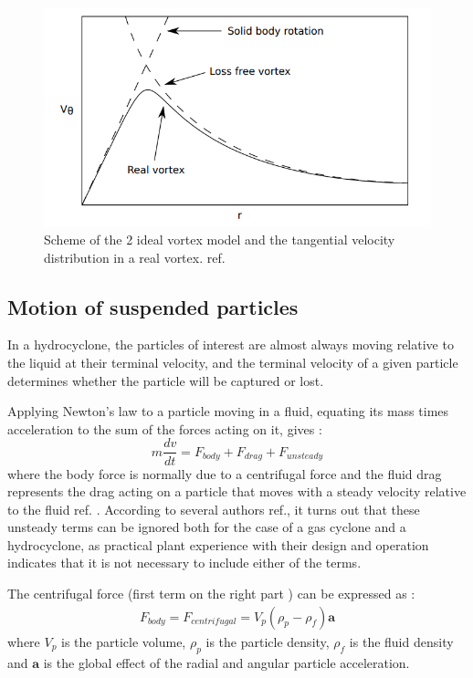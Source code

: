 \begin{figure}[H]
	\centering
	\includegraphics[width=0.5\linewidth]{images/tangential_velocity_schema.png}
	\captionsetup{font=bf, size=small}
	\caption{Scheme of the 2 ideal vortex model and the tangential velocity distribution in a real vortex. ref.\cite{Marthinussen2011}}
	\label{tangential_velocity}
\end{figure}

\subsection{Motion of suspended particles}
In a hydrocyclone, the particles of interest are almost always moving relative to the liquid at their terminal velocity, and the terminal velocity of a given particle determines whether the particle will be captured or lost.

Applying Newton’s law to a particle moving in a fluid, equating its mass times acceleration to the sum of the forces acting on it, gives :
\begin{equation}
	m \frac{d v}{d t}= F_{body} + F_{drag} + F_{unsteady}
\end{equation}
where the body force is normally due to a centrifugal force and the fluid drag represents the drag acting on a
particle that moves with a steady velocity relative to the fluid ref.\cite{Sabbagh2014} .
According to several authors ref.\cite{Concha2007,Marthinussen2011}, it turns out that these unsteady terms can be ignored both for the case of a gas cyclone and a hydrocyclone, as practical plant experience with their design and operation indicates that it is not necessary to include either of the terms.


The centrifugal force (first term on the right part ) can be expressed as :
\begin{align}
	F_{body}=F_{centrifugal}=V_p \left( \rho_p-\rho_{f} \right) \textbf{a}
\end{align}
where $V_p$ is the particle volume, $\rho_p$ is the particle density, $\rho_f$ is the fluid density and $\textbf{a}$ is the global effect of the radial and angular particle acceleration. 

